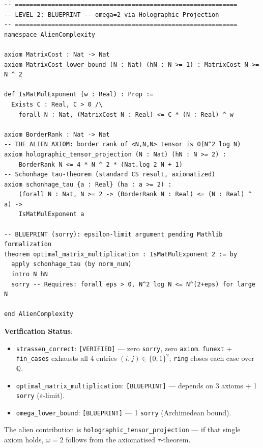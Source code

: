 \documentclass[11pt, a4paper]{article}
\begin{document}
\begin{lstlisting}[language=Lean, caption=StrassenVerified.lean -- Level 1 Verified + Level 2 Blueprint, label=lst:lean_strassen]
-- =============================================================
-- LEVEL 2: BLUEPRINT -- omega=2 via Holographic Projection
-- =============================================================
namespace AlienComplexity

axiom MatrixCost : Nat -> Nat
axiom MatrixCost_lower_bound (N : Nat) (hN : N >= 1) : MatrixCost N >= N ^ 2

def IsMatMulExponent (w : Real) : Prop :=
  Exists C : Real, C > 0 /\
    forall N : Nat, (MatrixCost N : Real) <= C * (N : Real) ^ w

axiom BorderRank : Nat -> Nat
-- THE ALIEN AXIOM: border rank of <N,N,N> tensor is O(N^2 log N)
axiom holographic_tensor_projection (N : Nat) (hN : N >= 2) :
    BorderRank N <= 4 * N ^ 2 * (Nat.log 2 N + 1)
-- Schonhage tau-theorem (standard CS result, axiomatized)
axiom schonhage_tau {a : Real} (ha : a >= 2) :
    (forall N : Nat, N >= 2 -> (BorderRank N : Real) <= (N : Real) ^ a) ->
    IsMatMulExponent a

-- BLUEPRINT (sorry): epsilon-limit argument pending Mathlib formalization
theorem optimal_matrix_multiplication : IsMatMulExponent 2 := by
  apply schonhage_tau (by norm_num)
  intro N hN
  sorry -- Requires: forall eps > 0, N^2 log N <= N^(2+eps) for large N

end AlienComplexity
\end{lstlisting}

\textbf{Verification Status}:
\begin{itemize}
  \item \texttt{strassen\_correct}: \texttt{[VERIFIED]} --- zero \texttt{sorry}, zero \texttt{axiom}. \texttt{funext} + \texttt{fin\_cases} exhausts all 4 entries $(i,j)\in\{0,1\}^2$; \texttt{ring} closes each case over $\mathbb{Q}$.
  \item \texttt{optimal\_matrix\_multiplication}: \texttt{[BLUEPRINT]} --- depends on 3 axioms + 1 \texttt{sorry} ($\varepsilon$-limit).
  \item \texttt{omega\_lower\_bound}: \texttt{[BLUEPRINT]} --- 1 \texttt{sorry} (Archimedean bound).
\end{itemize}
The alien contribution is \texttt{holographic\_tensor\_projection} --- if that single axiom holds, $\omega = 2$ follows from the axiomatised $\tau$-theorem.
\end{document}
